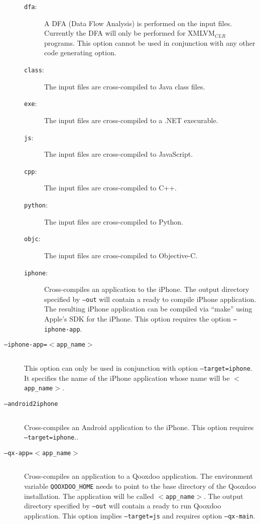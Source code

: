 \documentclass[12pt]{article}
\begin{document}
\begin{description}
\begin{description}
\item[\texttt{dfa}:] A DFA (Data Flow Analysis) is performed on the
  input files. Currently the DFA will only be performed for
  XMLVM$_{CLR}$ programs. This option cannot be used in conjunction
  with any other code generating option.

\item[\texttt{class}:] The input files are cross-compiled to Java
  class files.

\item[\texttt{exe}:] The input files are cross-compiled to a .NET
  execurable.

\item[\texttt{js}:] The input files are cross-compiled to JavaScript.

\item[\texttt{cpp}:] The input files are cross-compiled to C++.

\item[\texttt{python}:] The input files are cross-compiled to Python.

\item[\texttt{objc}:] The input files are cross-compiled to
  Objective-C.

\item[\texttt{iphone}:] Cross-compiles an application to the iPhone.
  The output directory specified by \texttt{--out} will contain a
  ready to compile iPhone application.  The resulting iPhone
  application can be compiled via ``make'' using Apple's SDK for the
  iPhone. This option requires the option \texttt{--iphone-app}.
\end{description}

\item[\texttt{--iphone-app=$<$app\_name$>$}] $ $

  This option can only be used in conjunction with option
  \texttt{--target=iphone}. It specifies the name of the iPhone
  application whose name will be \texttt{$<$app\_name$>$}.

\item[\texttt{--android2iphone}] $ $

  Cross-compiles an Android application to the iPhone. This option
  requires \texttt{--target=iphone}..

\item[\texttt{--qx-app=$<$app\_name$>$}] $ $

  Cross-compiles an application to a Qooxdoo application. The
  environment variable \texttt{QOOXDOO\_HOME} needs to point to the
  base directory of the Qooxdoo installation. The application will be
  called \texttt{$<$app\_name$>$}. The output directory specified by
  \texttt{--out} will contain a ready to run Qooxdoo application. This
  option implies \texttt{--target=js} and requires option
  \texttt{--qx-main}.


\end{description}
\end{document}
